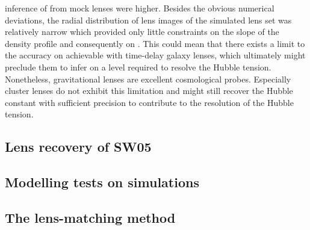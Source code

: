 inference of \Ho{} from mock lenses were higher.  Besides the obvious numerical
deviations, the radial distribution of lens images of the simulated lens set was
relatively narrow which provided only little constraints on the slope of the
density profile and consequently on \Ho.  This could mean that there exists a
limit to the accuracy on \Ho{} achievable with time-delay galaxy lenses, which
ultimately might preclude them to infer \Ho{} on a level required to resolve the
Hubble tension.  Nonetheless, gravitational lenses are excellent cosmological
probes. Especially cluster lenses do not exhibit this limitation and might still
recover the Hubble constant with sufficient precision to contribute to the
resolution of the Hubble tension.

\subsection{Lens recovery of SW05}

\subsection{Modelling tests on simulations}

\subsection{The lens-matching method}
